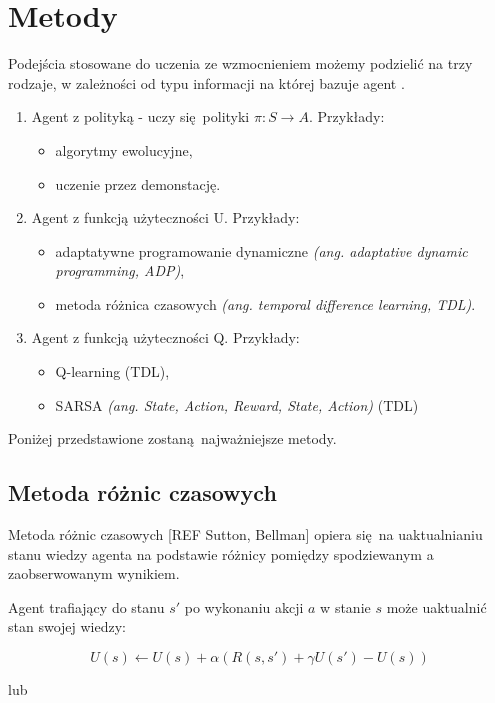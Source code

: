 \section{Metody}\label{methods}

Podejścia stosowane do uczenia ze wzmocnieniem możemy podzielić na trzy rodzaje, w zależności od typu informacji na której bazuje agent \cite{wjaskowski2016}.

\begin{enumerate}
\item Agent z polityką - uczy się polityki  $\pi: S \rightarrow A$. Przykłady:
\begin{itemize}
\item algorytmy ewolucyjne,
\item uczenie przez demonstację.
\end{itemize}
\item Agent z funkcją użyteczności U. Przykłady:
\begin{itemize}
\item adaptatywne programowanie dynamiczne \textit{(ang. adaptative dynamic programming, ADP)},
\item metoda różnica czasowych \textit{(ang. temporal difference learning, TDL)}.
\end{itemize}
\item Agent z funkcją użyteczności Q. Przykłady:
\begin{itemize}
\item Q-learning (TDL),
\item SARSA \textit{(ang. State, Action, Reward, State, Action)} (TDL)
\end{itemize}
\end{enumerate}

Poniżej przedstawione zostaną najważniejsze metody.

\subsection{Metoda różnic czasowych}\label{tdl}

Metoda różnic czasowych [REF Sutton, Bellman] opiera się na uaktualnianiu stanu wiedzy agenta na podstawie różnicy pomiędzy spodziewanym a zaobserwowanym wynikiem.

Agent trafiający do stanu $s'$ po wykonaniu akcji $a$ w stanie $s$ może uaktualnić stan swojej wiedzy:

$$U(s) \leftarrow U(s) + \alpha (R(s,s') + \gamma U(s') - U (s))$$

lub

